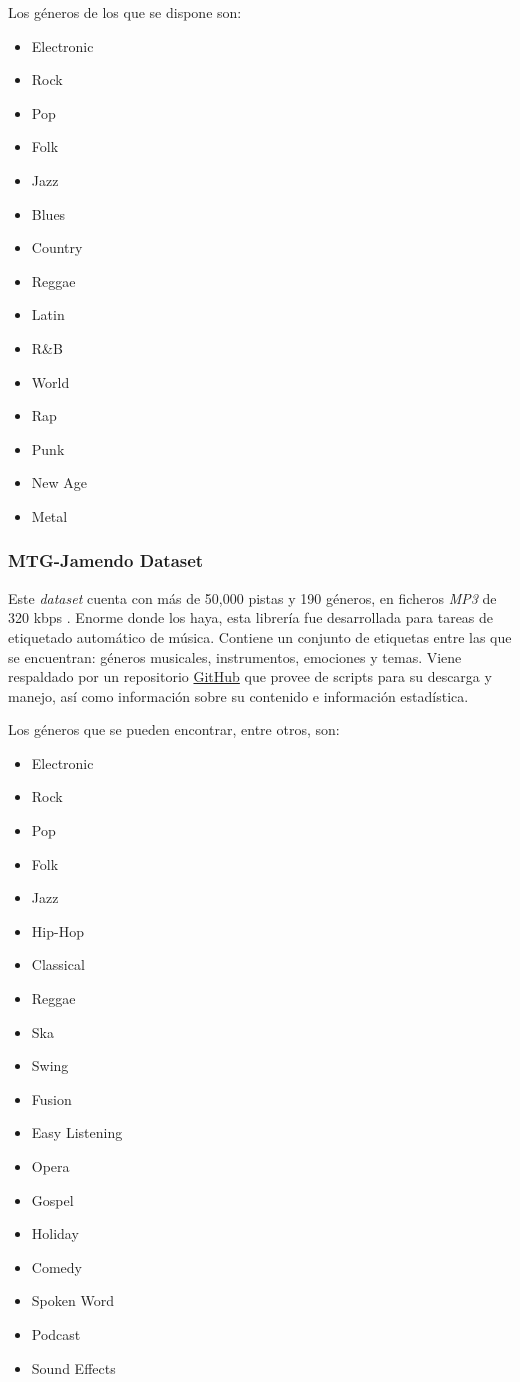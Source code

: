 Los géneros de los que se dispone son:
\begin{multicols}{4}
\begin{itemize}
    \item Electronic
    \item Rock
    \item Pop
    \item Folk
    \item Jazz
    \item Blues
    \item Country
    \item Reggae
    \item Latin
    \item R\&B
    \item World
    \item Rap
    \item Punk
    \item New Age
    \item Metal
\end{itemize}
\end{multicols}

\subsubsection{MTG-Jamendo Dataset}

Este \emph{dataset} cuenta con más de 50,000 pistas y 190 géneros, en ficheros \emph{MP3} de 320 kbps . Enorme donde los haya, esta librería fue desarrollada para tareas de etiquetado automático de música. Contiene un conjunto de etiquetas entre las que se encuentran: géneros musicales, instrumentos, emociones y temas. Viene respaldado por un repositorio \href{https://github.com/MTG/mtg-jamendo-dataset}{GitHub} que provee de scripts para su descarga y manejo, así como información sobre su contenido e información estadística.

Los géneros que se pueden encontrar, entre otros, son:
\begin{multicols}{4}
\begin{itemize}
    \item Electronic
    \item Rock
    \item Pop
    \item Folk
    \item Jazz
    \item Hip-Hop
    \item Classical
    \item Reggae
    \item Ska
    \item Swing
    \item Fusion
    \item Easy Listening
    \item Opera
    \item Gospel
    \item Holiday
    \item Comedy
    \item Spoken Word
    \item Podcast
    \item Sound Effects
\end{itemize}
\end{multicols}

